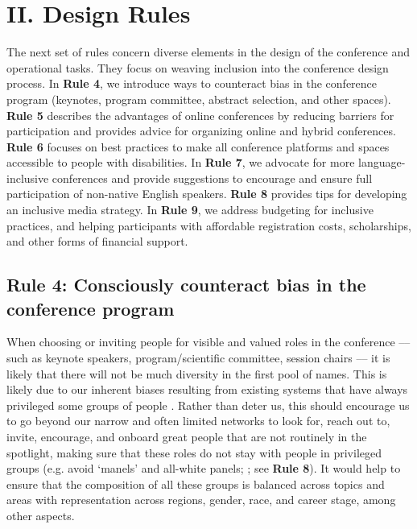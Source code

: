 \documentclass[10pt,letterpaper]{article}
\begin{document}
\section*{II. Design Rules}

The next set of rules concern diverse elements in the design of the conference and operational tasks. They focus on weaving inclusion into the conference design process.
In \textbf{Rule 4}, we introduce ways to counteract bias in the conference program (keynotes, program committee, abstract selection, and other spaces). 
\textbf{Rule 5} describes the advantages of online conferences by reducing barriers for participation and provides advice for organizing online and hybrid conferences.
\textbf{Rule 6} focuses on best practices to make all conference platforms and spaces accessible to people with disabilities. 
In \textbf{Rule 7}, we advocate for more language-inclusive conferences and provide suggestions to encourage and ensure full participation of non-native English speakers. 
\textbf{Rule 8} provides tips for developing an inclusive media strategy. 
In \textbf{Rule 9}, we address budgeting for inclusive practices, and helping participants with affordable registration costs, scholarships, and other forms of financial support.


\subsection*{Rule 4: Consciously counteract bias in the conference program}
\label{rule_unbias}

When choosing or inviting people for visible and valued roles in the conference –– such as keynote speakers, program/scientific committee, session chairs –– it is likely that there will not be much diversity in the first pool of names.
This is likely due to our inherent biases resulting from existing systems that have always privileged some groups of people \cite{dwyerNoticeWhoScience2021,swartzScienceValueDiversity2019,wongBuildDiversityScience2020,dignazioUnicornsJanitorsNinjas2020}. 
Rather than deter us, this should encourage us to go beyond our narrow and often limited networks to look for, reach out to, invite, encourage, and onboard great people that are not routinely in the spotlight, making sure that these roles do not stay with people in privileged groups (e.g. avoid `manels' and all-white panels; \cite{else_how_2019}; see \textbf{Rule 8}).
 It would help to ensure that the composition of all these groups is balanced across topics and areas with representation across regions, gender, race, and career stage, among other aspects.
\end{document}
